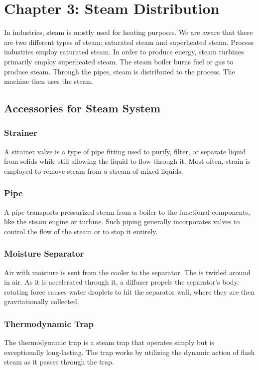 \section{Chapter 3: Steam Distribution}
In industries, steam is mostly used for heating purposes. We are aware that there are two different types of steam: saturated steam and superheated steam. Process industries employ saturated steam. In order to produce energy, steam turbines primarily employ superheated steam. The steam boiler burns fuel or gas to produce steam. Through the pipes, steam is distributed to the process. The machine then uses the steam.

\subsection{Accessories for Steam System}

\subsubsection{Strainer}
A strainer valve is a type of pipe fitting used to purify, filter, or separate liquid from solids while still allowing the liquid to flow through it. Most often, strain is employed to remove steam from a stream of mixed liquids.

\subsubsection{Pipe}
A pipe transports pressurized steam from a boiler to the functional components, like the steam engine or turbine. Such piping generally incorporates valves to control the flow of the steam or to stop it entirely.

\subsubsection{Moisture Separator}
Air with moisture is sent from the cooler to the separator. The is twirled around in air. As it is accelerated through it, a diffuser propels the separator's body. rotating force causes water droplets to hit the separator wall, where they are then gravitationally collected.

\subsubsection{Thermodynamic Trap}
The thermodynamic trap is a steam trap that operates simply but is exceptionally long-lasting. The trap works by utilizing the dynamic action of flash steam as it passes through the trap.

